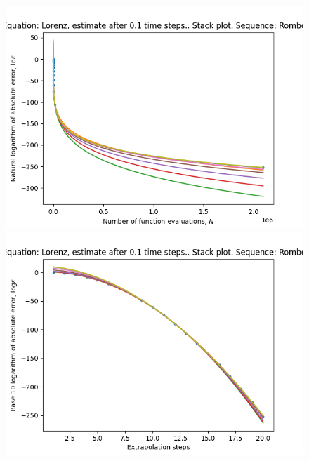\begin{figure}[H]
\centering
\begin{minipage}{0.45\textwidth}
\centering
\includegraphics[scale=0.45]{emr_plots/lorenz_hp_romberg_stack.png}
\end{minipage}
\begin{minipage}{0.45\textwidth}
\centering
\includegraphics[scale=0.45]{emr_plots/lorenz_hp_romberg_steps_stack.png}
\end{minipage}
\end{figure}

